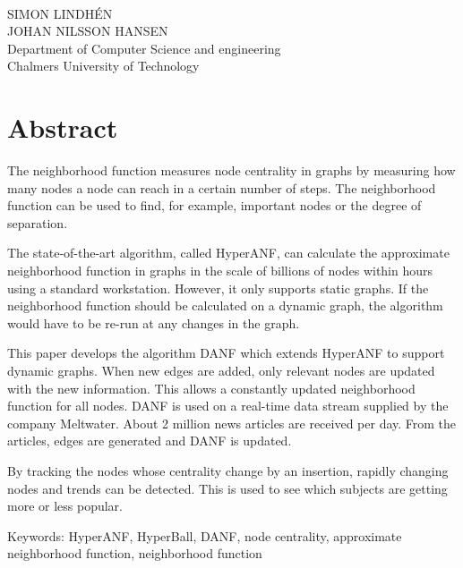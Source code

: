 \maintitle\\
\subtitle\\
SIMON LINDHÉN\\
JOHAN NILSSON HANSEN\\
Department of Computer Science and engineering\\
Chalmers University of Technology \setlength{\parskip}{0.5cm}

\thispagestyle{plain}			%
\setlength{\parskip}{0pt plus 1.0pt}
\setlength{\parindent}{15pt}
\section*{Abstract}
The neighborhood function measures node centrality in graphs by measuring how many nodes a node can reach in a certain number of steps. The neighborhood function can be used to find, for example, important nodes or the degree of separation. 

The state-of-the-art algorithm, called HyperANF, can calculate the approximate neighborhood function in graphs in the scale of billions of nodes within hours using a standard workstation\cite{hyperanf}. However, it only supports static graphs. If the neighborhood function should be calculated on a dynamic graph, the algorithm would have to be re-run at any changes in the graph. 

This paper develops the algorithm DANF which extends HyperANF to support dynamic graphs. When new edges are added, only relevant nodes are updated with the new information. This allows a constantly updated neighborhood function for all nodes. DANF is used on a real-time data stream supplied by the company Meltwater. About 2 million news articles are received per day. From the articles, edges are generated and DANF is updated. 

By tracking the nodes whose centrality change by an insertion, rapidly changing nodes and trends can be detected. This is used to see which subjects are getting more or less popular. 

\vfill
\noindent Keywords: HyperANF, HyperBall, DANF, node centrality, approximate neighborhood function, neighborhood function

\newpage				%
\thispagestyle{empty}
\mbox{}